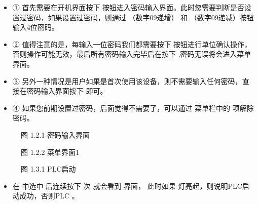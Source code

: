 \documentclass[a4paper,10pt,english]{sphinxmanual}
\begin{document}
\sphinxAtStartPar
{}
\begin{itemize}
\item {} 
\sphinxAtStartPar
① 首先需要在开机界面按下  按钮进入密码输入界面。此时您需要判断是否设置过密码，如果设置过密码，则通过  （数字0\sphinxhyphen{}9递增） 和  （数字0\sphinxhyphen{}9递减）按钮输入4位密码。

\item {} 
\sphinxAtStartPar
② 值得注意的是，每输入一位密码我们都需要按下  按钮进行单位确认操作，否则操作可能无效，最后所有密码输入完毕后在按下  ,密码无误将会进入菜单界面。

\item {} 
\sphinxAtStartPar
③ 另外一种情况是用户如果是首次使用该设备，则不需要输入任何密码，直接在密码输入界面按下  即可。

\item {} 
\sphinxAtStartPar
④ 如果您前期设置过密码，后面觉得不需要了，可以通过 菜单栏中的  项解除密码。

\end{itemize}

\begin{figure}[htbp]
\centering
\capstart

\noindent{}
\caption{图 1.2.1 密码输入界面}\label{\detokenize{operation_guide:id6}}\end{figure}

\begin{figure}[htbp]
\centering
\capstart

\noindent{}
\caption{图 1.2.2 菜单界面1}\label{\detokenize{operation_guide:id7}}\end{figure}

\sphinxAtStartPar
{}

\begin{figure}[htbp]
\centering
\capstart

\noindent{}
\caption{图 1.3.1 PLC启动}\label{\detokenize{operation_guide:id8}}\end{figure}
\begin{itemize}
\item {} 
\sphinxAtStartPar
在  中选中  后连续按下  次  就会看到  界面，
此时如果  灯亮起，则说明PLC启动成功，否则PLC 。

\end{itemize}
\end{document}
